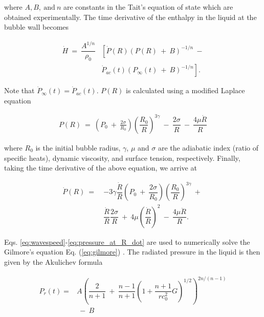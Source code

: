 \documentclass[preprint, linenumbers]{revtex4-2}
\newcommand{\eq}[1]{Eq. {(#1)} }
\begin{document}
\noindent where $A, B,~\mathrm{and}~n$ are constants in the Tait's equation of state which are obtained experimentally. The time derivative of the enthalpy in the liquid at the bubble wall becomes

\begin{align}
	\label{eq:enthalpy_dot}
	\dot{H} ~=~ \dfrac{A^{1/n}}{\rho_0} & \left[ \dot{P}(R)\left(P(R) ~+~ B\right)^{-1/n} ~ - \right. \nonumber \\
	                                    & \left. \dot{P}_{ac}(t) \left(P_\infty(t) ~+~ B\right)^{-1/n} \right]. 
\end{align}

\noindent Note that $\dot{P}_\infty(t)=\dot{P}_{ac}(t)$. $P(R)$ is calculated using a modified Laplace equation

\begin{align}
	\label{eq:pressure_at_R}                                                                                                            
	P(R)~=~ \left(P_0~+~\frac{2\sigma}{R_0}\right) \left(\dfrac{R_0}{R}\right)^{3\gamma}~-~\dfrac{2\sigma}{R}~-~\dfrac{4\mu \dot{R}}{R} 
\end{align}

\noindent where $R_0$ is the initial bubble radius, $\gamma$, $\mu$ and $\sigma$ are the adiabatic index (ratio of specific heats), dynamic viscosity, and surface tension, respectively. Finally, taking the time derivative of the above equation, we arrive at

\begin{align}
	\label{eq:pressure_at_R_dot}
	\dot{P}(R)~=~ & -3\gamma\dfrac{\dot{R}}{R} \left(P_0~+~\dfrac{2\sigma}{R_0}\right) \left(\dfrac{R_0}{R}\right)^{3\gamma}~+~ \nonumber \\
	              & \dfrac{\dot{R}}{R}\dfrac{2\sigma}{R}~+~4\mu \left(\dfrac{\dot{R}}{R}\right)^2~-~\dfrac{4\mu \ddot{R}}{R}.             
\end{align}

\noindent Eqs. \ref{eq:wavespeed}-\ref{eq:pressure_at_R_dot} are used to numerically solve the Gilmore's equation \eq{\ref{eq:gilmore}}. The radiated pressure in the liquid is then given by the Akulichev formula

\begin{align}
	\label{eq:akulichev}
	P_{r}(t)= & A \left(\dfrac{2}{n+1} ~ + ~\dfrac{n-1}{n+1} \left( 1 + \dfrac{n+1}{r c_0^2 } G \right)^{1/2} \right)^{2n/(n-1)} \nonumber \\
	          & ~ - ~ B                                                                                                                    
\end{align}
\end{document}
